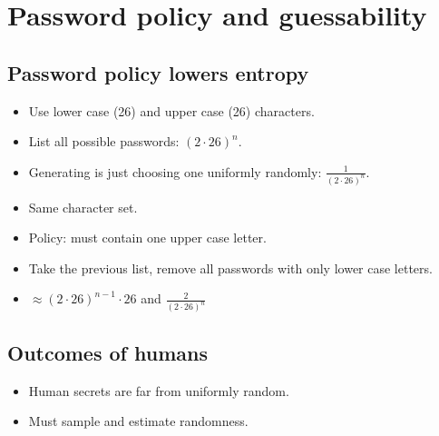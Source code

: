 \section[Password guessability]{Password policy and guessability}

\subsection{Password policy lowers entropy}

\begin{frame}
  \begin{example}
    \begin{itemize}
      \item Use lower case (26) and upper case (26) characters.
      \item List all possible passwords: \((2\cdot 26)^n\).
      \item Generating is just choosing one uniformly randomly: 
        \(\frac{1}{(2\cdot 26)^n}\).
    \end{itemize}
  \end{example}
\end{frame}

\begin{frame}
  \begin{example}
    \begin{itemize}
      \item Same character set.
      \item Policy: must contain one upper case letter.
      \item Take the previous list, remove all passwords with only lower case 
        letters.
      \item \(\approx (2\cdot 26)^{n-1}\cdot 26\) and \(\frac{2}{(2\cdot 
        26)^n}\)
    \end{itemize}
  \end{example}
\end{frame}

\subsection{Outcomes of humans}

\begin{frame}
  \begin{remark}
    \begin{itemize}
      \item Human secrets are far from uniformly random.
      \item Must sample and estimate randomness.
    \end{itemize}
  \end{remark}
\end{frame}



\begin{frame}[allowframebreaks]
  \printbibliography
\end{frame}
